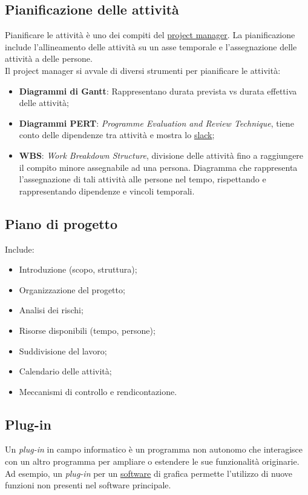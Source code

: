 	\subsection{Pianificazione delle attività}
	\label{sec:pianificazioneattivita}
	Pianificare le attività è uno dei compiti del \underline{\hyperref[sec:projectmanager]{project manager}}.
	La pianificazione include l'allineamento delle attività su un asse temporale e l'assegnazione delle attività a delle persone. \\Il project manager si avvale di diversi strumenti per pianificare le attività:
	\begin{itemize}
	\item \textbf{Diagrammi di Gantt}: Rappresentano durata prevista vs durata effettiva delle attività;
	\item \textbf{Diagrammi PERT}: \emph{Programme Evaluation and Review Technique}, tiene conto delle dipendenze tra attività e mostra lo \hyperref[sec:slack]{slack};
	\item \textbf{WBS}: \emph{Work Breakdown Structure}, divisione delle attività fino a raggiungere il compito minore assegnabile ad una persona. Diagramma che rappresenta l'assegnazione di tali attività alle persone nel tempo, rispettando e rappresentando dipendenze e vincoli temporali.
	\end{itemize}

	\subsection{Piano di progetto}
	\label{sec:pianoprogetto}
	Include:
	\begin{itemize}
		\item Introduzione (scopo, struttura);
		\item Organizzazione del progetto;
		\item Analisi dei rischi;
		\item Risorse disponibili (tempo, persone);
		\item Suddivisione del lavoro;
		\item Calendario delle attività;
		\item Meccanismi di controllo e rendicontazione.
	\end{itemize}

	\subsection{Plug-in}
	\label{sec:plug-in}
	Un \emph{plug-in} in campo informatico è un programma non autonomo che interagisce con un altro programma per ampliare o estendere le sue funzionalità originarie. Ad esempio, un \emph{plug-in} per un \underline{\hyperref[sec:prodottosoftware]{software}} di grafica permette l'utilizzo di nuove funzioni non presenti nel software principale.


